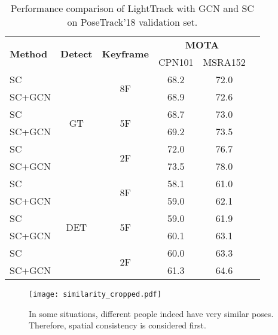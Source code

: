 \documentclass[10pt,twocolumn,letterpaper]{article}
\begin{document}
	
	\begin{table}[h]
\vspace{-3pt}
		\setlength{\tabcolsep}{5pt}
		\footnotesize
		\centering 
		\begin{tabular}{lccccc}
			\toprule
			\multirow{2}{*}{\textbf{Method}} &\multirow{2}{*}{\textbf{Detect}} &\multirow{2}{*}{\textbf{Keyframe}}  &\multicolumn{2}{c}{\textbf{MOTA}}  \\
			\cline{4-5}
			& & &CPN101 &MSRA152 \\
			\midrule
			SC        &\multirow{6}{*}{GT} &\multirow{2}{*}{8F}  &68.2 &72.0   \\
            SC+GCN & & &68.9 & 72.6    \\
            \cmidrule{1-1}\cmidrule{3-5}
            SC       & &\multirow{2}{*}{5F}  &68.7 &73.0  \\
            SC+GCN & &  & 69.2  &73.5   \\
             \cmidrule{1-1}\cmidrule{3-5}
            SC       & &\multirow{2}{*}{2F}  &72.0 &76.7   \\
            SC+GCN & &  & 73.5  &78.0   \\
			\midrule
			SC        &\multirow{6}{*}{DET} &\multirow{2}{*}{8F}  &58.1 &61.0   \\
			SC+GCN & & &59.0 & 62.1    \\
			\cmidrule{1-1}\cmidrule{3-5}
			SC       & &\multirow{2}{*}{5F}  &59.0 &61.9  \\
			SC+GCN & &  & 60.1  &63.1   \\
			\cmidrule{1-1}\cmidrule{3-5}
		    SC       & &\multirow{2}{*}{2F}  &60.0 &63.3   \\
	        SC+GCN & &  & 61.3  &64.6   \\
			\bottomrule
		\end{tabular}
		\vspace{3pt}
		\caption{Performance comparison of LightTrack with GCN and SC on PoseTrack'18 validation set.}
		\vspace{-.2in}
		\label{GCN_SC}
	\end{table}


	
	\begin{figure}[h]
		\centering
		\texttt{[image: similarity\_cropped.pdf]}
		\caption{In some situations, different people indeed have very similar poses. Therefore, spatial consistency is considered first.} 
		\label{fig:similarity}
		\vspace{-.1in}
	\end{figure}
\end{document}
